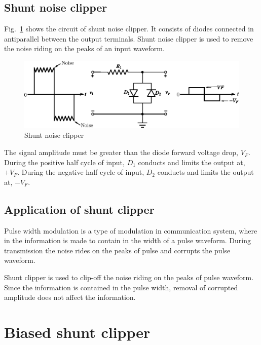 \eject

\subsection{Shunt noise clipper}\label{sec2.31.5}

Fig.~\ref{fig2.34} shows the circuit of shunt noise clipper. It consists of diodes connected in antiparallel between the output terminals. Shunt noise clipper is used to remove the noise riding on the peaks of an input waveform.
\begin{figure}[H]
\centering
\includegraphics[scale=.97]{chap2/fig2.34.eps}
\caption{Shunt noise clipper}\label{fig2.34}
\end{figure}

The signal amplitude must be greater than the diode forward voltage drop, $V_{F}$. During the positive half cycle of input, $D_{1}$ conducts and limits the output at, $+V_{F}$. During the negative half cycle of input, $D_{2}$ conducts and limits the output at, $-V_{F}$.\\[-20pt]

\subsection{Application of shunt clipper}\label{sec2.31.6}

Pulse width modulation is a type of modulation in communication system, where in the information is made to contain in the width of a pulse waveform. During transmission the noise rides on the peaks of pulse and corrupts the pulse waveform. 

Shunt clipper is used to clip-off the noise riding on the peaks of pulse waveform. Since the information is contained in the pulse width, removal of corrupted amplitude does not affect the information.\\[-20pt]

\section{Biased shunt clipper}\label{sec2.32}

